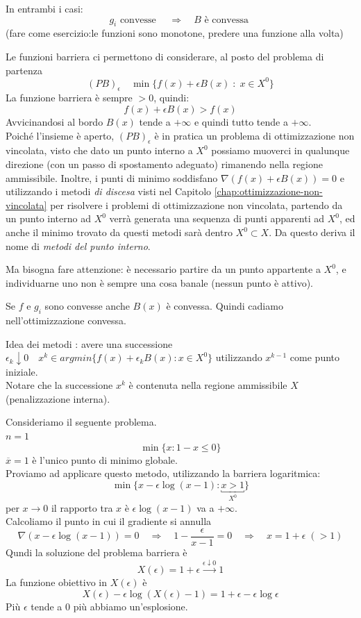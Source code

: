 \begin{observation}
In entrambi i casi: 
$$ g_i \text{ convesse } \quad \Rightarrow \quad B 
\text{ \`e convessa }$$
(fare come esercizio:le funzioni sono monotone, 
predere una funzione alla volta)
\end{observation}
Le funzioni barriera ci permettono di considerare, al posto del
problema di partenza
$$(PB)_{\epsilon} \quad \min\{f(x) + \epsilon B(x) \; : \; x \in X^{0} \} $$
La funzione barriera \`e sempre $> 0$, quindi:
$$f(x) + \epsilon B(x) > f(x)$$
Avvicinandosi al bordo $B(x)$ tende a $+\infty$ e quindi tutto
tende a $+ \infty$.\\
Poich\'e l'insieme \`e aperto, $(PB)_{\epsilon}$ \`e in pratica un problema di ottimizzazione non vincolata, visto che dato un punto interno a $X^0$ possiamo muoverci in qualunque direzione (con un passo di spostamento adeguato) rimanendo nella regione ammissibile. Inoltre, i punti di minimo soddisfano $\nabla(f(x) + \epsilon B(x)) =0$
e utilizzando i metodi \emph{di discesa} visti nel Capitolo \ref{chap:ottimizzazione-non-vincolata} per risolvere i problemi di ottimizzazione non vincolata, partendo da un punto interno ad $X^0$ verrà generata una sequenza di punti apparenti ad $X^{0}$, ed anche il minimo trovato da questi metodi sarà dentro $X^0 \subset X$. Da questo deriva il nome di \emph{metodi del punto interno}.

Ma bisogna fare attenzione: è necessario partire da un punto appartente a $X^{0}$, e individuarne uno non è sempre una cosa banale (nessun punto \`e attivo).
\begin{observation}
  Se $f$ e $g_i$ sono convesse anche $B(x)$ \`e convessa.
Quindi cadiamo nell'ottimizzazione convessa.
\end{observation}
Idea dei metodi : avere una successione $\epsilon_{k}\downarrow 0
\quad x^{k} \in argmin \{ f(x) + \epsilon_{k} B(x): x \in X^{0} \}$
utilizzando $x^{k-1}$ come punto iniziale. \\
Notare che la successione $x^{k}$ \`e contenuta nella regione
ammissibile $X$ (penalizzazione interna).

\begin{example}
Consideriamo il seguente problema. \\
$n=1$
$$\min \{ x : 1-x \leq 0 \}$$
$\overline{x} = 1$ \`e l'unico punto di minimo globale. \\
Proviamo ad applicare questo metodo, utilizzando la barriera
logaritmica:
$$ \min \{x - \epsilon \log{(x-1)} : \underbracket{x > 1}_{X^{0} } 
\}$$
per $x \rightarrow 0$
il rapporto tra $x$ \`e $\epsilon \log(x-1)$ va a $+ \infty$. \\
Calcoliamo il punto in cui il gradiente si annulla
$$\nabla (x - \epsilon \log(x-1)) =0  \quad \Rightarrow \quad
 1- \dfrac{\epsilon}{x-1} = 0 \quad 
\Rightarrow \quad  x = 1 + \epsilon \; (>1)$$
Qundi la soluzione del problema barriera \`e
$$ X(\epsilon) = 1 + \epsilon \xrightarrow{\epsilon \downarrow 0 } 1 $$
La funzione obiettivo in $X(\epsilon)$ \`e
$$ X(\epsilon) - \epsilon \log (X(\epsilon) -1)
= 1 + \epsilon - \epsilon \log \epsilon
 $$
Pi\`u $\epsilon$ tende a 0 pi\`u abbiamo un'esplosione.
\end{example}

